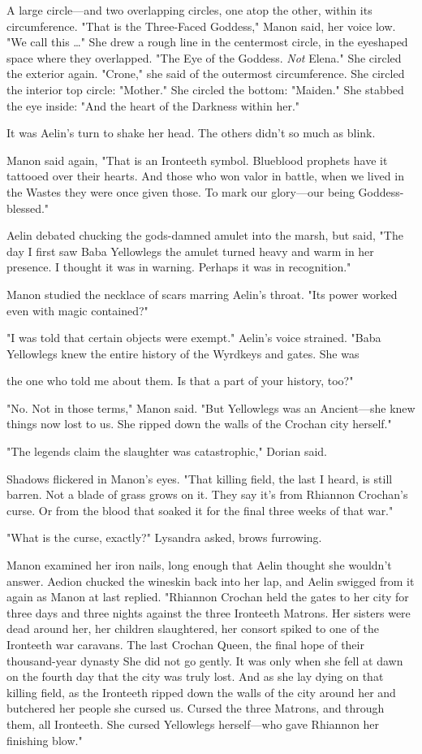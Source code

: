 A large circle---and two overlapping circles, one atop the other, within its circumference. "That is the Three-Faced Goddess," Manon said, her voice low. "We call this \ldots" She drew a rough line in the centermost circle, in the eyeshaped space where they overlapped. "The Eye of the Goddess. \emph{Not} Elena." She circled the exterior again. "Crone," she said of the outermost circumference. She circled the interior top circle: "Mother." She circled the bottom: "Maiden." She stabbed the eye inside: "And the heart of the Darkness within her."

It was Aelin's turn to shake her head. The others didn't so much as blink.

Manon said again, "That is an Ironteeth symbol. Blueblood prophets have it tattooed over their hearts. And those who won valor in battle, when we lived in the Wastes  they were once given those. To mark our glory---our being Goddess-blessed."

Aelin debated chucking the gods-damned amulet into the marsh, but said, "The day I first saw Baba Yellowlegs  the amulet turned heavy and warm in her presence. I thought it was in warning. Perhaps it was in
 recognition."

Manon studied the necklace of scars marring Aelin's throat. "Its power worked even with magic contained?"

"I was told that certain objects were  exempt." Aelin's voice strained. "Baba Yellowlegs knew the entire history of the Wyrdkeys and gates. She was

the one who told me about them. Is that a part of your history, too?"

"No. Not in those terms," Manon said. "But Yellowlegs was an Ancient---she knew things now lost to us. She ripped down the walls of the Crochan city herself."

"The legends claim the slaughter was  catastrophic," Dorian said.

Shadows flickered in Manon's eyes. "That killing field, the last I heard, is still barren. Not a blade of grass grows on it. They say it's from Rhiannon Crochan's curse. Or from the blood that soaked it for the final three weeks of that war."

"What is the curse, exactly?" Lysandra asked, brows furrowing.

Manon examined her iron nails, long enough that Aelin thought she wouldn't answer. Aedion chucked the wineskin back into her lap, and Aelin swigged from it again as Manon at last replied. "Rhiannon Crochan held the gates to her city for three days and three nights against the three Ironteeth Matrons. Her sisters were dead around her, her children slaughtered, her consort spiked to one of the Ironteeth war caravans. The last Crochan Queen, the final hope of their thousand-year dynasty
 She did not go gently. It was only when she fell at dawn on the fourth day that the city was truly lost. And as she lay dying on that killing field, as the Ironteeth ripped down the walls of the city around her and butchered her people  she cursed us. Cursed the three Matrons, and through them, all Ironteeth. She cursed Yellowlegs herself---who gave Rhiannon her finishing blow."


